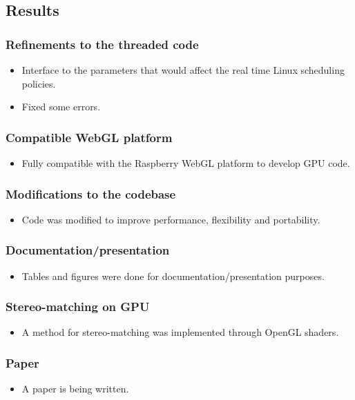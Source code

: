 \subsection{Results}

\subsubsection{Refinements to the threaded code}
\begin{itemize}
	\item Interface to the parameters that would affect the real time Linux scheduling policies.
	\item Fixed some errors.
\end{itemize}
\subsubsection{Compatible WebGL platform}
\begin{itemize}
	\item Fully compatible with the Raspberry WebGL platform to develop GPU code.
\end{itemize}
\subsubsection{Modifications to the codebase}
\begin{itemize}
	\item Code was modified to improve performance, flexibility and portability.
\end{itemize}
\subsubsection{Documentation/presentation}
\begin{itemize}
	\item Tables and figures were done for documentation/presentation purposes.
\end{itemize}
\subsubsection{Stereo-matching on GPU}
\begin{itemize}
	\item A method for stereo-matching was implemented through OpenGL shaders.
\end{itemize}
\subsubsection{Paper}
\begin{itemize}
	\item A paper is being written.
\end{itemize}
